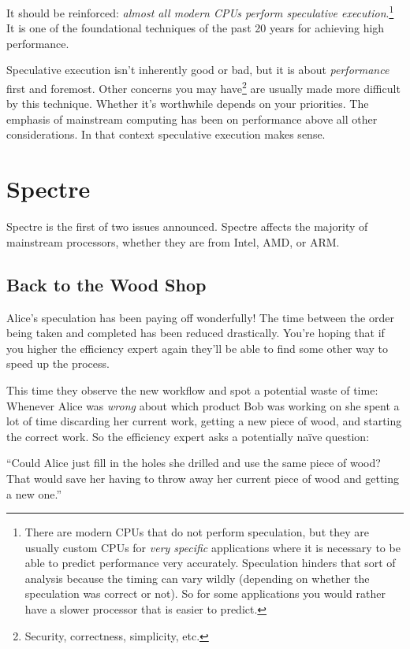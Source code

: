 \documentclass{article}
\begin{document}
It should be reinforced: \emph{almost all modern CPUs perform speculative
execution}.\footnote{There are modern CPUs that do not perform speculation, but
they are usually custom CPUs for \emph{very specific} applications where it is
necessary to be able to predict performance very accurately. Speculation
hinders that sort of analysis because the timing can vary wildly (depending on
whether the speculation was correct or not). So for some applications you would
rather have a slower processor that is easier to predict.} It is one of the
foundational techniques of the past 20 years for achieving high performance.

Speculative execution isn't inherently good or bad, but it is about
\emph{performance} first and foremost. Other concerns you may
have\footnote{Security, correctness, simplicity, etc.} are usually made more
difficult by this technique. Whether it's worthwhile depends on your
priorities. The emphasis of mainstream computing has been on performance above
all other considerations. In that context speculative execution makes sense.

\section{Spectre}

Spectre is the first of two issues announced. Spectre affects the majority of
mainstream processors, whether they are from Intel, AMD, or ARM.

\subsection*{Back to the Wood Shop}

Alice's speculation has been paying off wonderfully! The time between the order
being taken and completed has been reduced drastically. You're hoping that if
you higher the efficiency expert again they'll be able to find some other way to
speed up the process.

This time they observe the new workflow and spot a potential waste of time:
Whenever Alice was \emph{wrong} about which product Bob was working on she
spent a lot of time discarding her current work, getting a new piece of wood,
and starting the correct work. So the efficiency expert asks a potentially
na\"{i}ve question:

``Could Alice just fill in the holes she drilled and use the same piece of
wood? That would save her having to throw away her current piece of wood and
getting a new one.''
\end{document}
